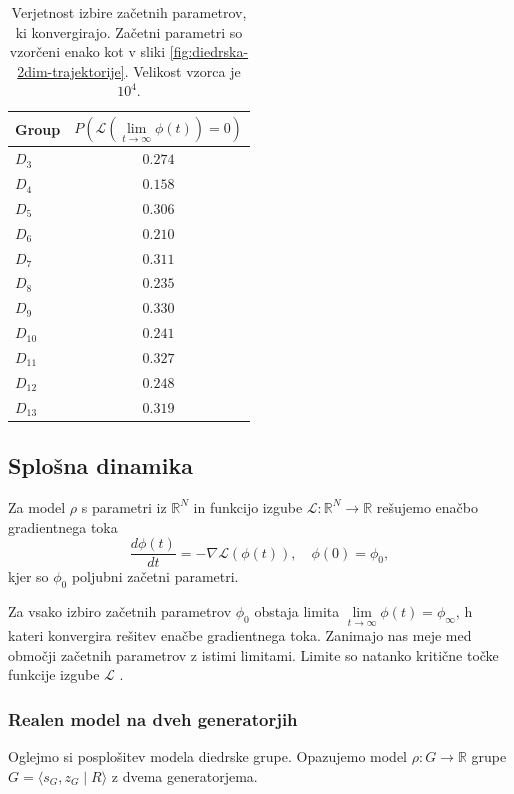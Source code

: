 \documentclass[mat2, tisk]{fmfdelo}
\newcommand{\R}{\mathbb R}
\newcommand{\loss}{\mathcal L}
\begin{document}
\begin{table}[ht]
  \centering
  \begin{tabular}{l|c}
    Group &  $P\left( \loss (\lim \limits_{t \to
    \infty}\phi(t)) = 0  \right)$\\
    \hline
    $D_{3}$ & $0.274$\\
    $D_{4}$ & $0.158$\\
    $D_{5}$ & $0.306$\\
    $D_{6}$ & $0.210$\\
    $D_{7}$ & $0.311$\\
    $D_{8}$ & $0.235$\\
    $D_{9}$ & $0.330$\\
    $D_{10}$ & $0.241$\\
    $D_{11}$ & $0.327$\\
    $D_{12}$ & $0.248$\\
    $D_{13}$ & $0.319$
  \end{tabular}
  \caption{Verjetnost izbire začetnih parametrov, ki
    konvergirajo. Začetni parametri so vzorčeni enako kot
    v sliki
  \ref{fig:diedrska-2dim-trajektorije}. Velikost vzorca je $10^4$.}
  \label{tab:verjetnost-konvergence-diedrska-2dim}
\end{table}
\clearpage
\subsection{Splošna dinamika}
%
Za model $\rho$ s parametri iz $\R^N$ in funkcijo izgube
$\loss \colon \R^N \to \R$ rešujemo enačbo gradientnega toka
$$\frac{d\phi(t)}{dt} = -\nabla \loss(\phi(t)), \quad
\phi(0) = \phi_0,$$
kjer so $\phi_0$ poljubni začetni parametri.

Za vsako izbiro začetnih parametrov $\phi_0$ obstaja
limita $\lim \limits_{t \to \infty} \phi(t) = \phi_\infty$,
h kateri konvergira
rešitev enačbe gradientnega toka. Zanimajo nas meje med območji
začetnih parametrov z istimi limitami.
%
Limite so natanko kritične točke funkcije izgube $\loss$
\cite[Trditev na strani 203]{Hirsch2012dynamical-systems}.

\subsubsection{Realen model na dveh generatorjih}
\label{subsection: realn z 2 generatorjema}
Oglejmo si posplošitev modela diedrske grupe. Opazujemo model
$\rho \colon G \to \R$ grupe $G=\langle s_G, z_G \mid R \rangle$ z dvema
generatorjema.
\end{document}

